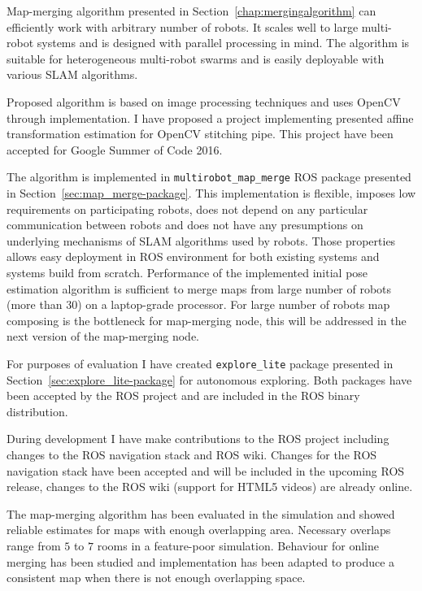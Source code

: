
Map-merging algorithm presented in Section~\ref{chap:mergingalgorithm} can efficiently work with arbitrary number of robots. It scales well to large multi-robot systems and is designed with parallel processing in mind. The algorithm is suitable for heterogeneous multi-robot swarms and is easily deployable with various \gls{SLAM} algorithms.

Proposed algorithm is based on image processing techniques and uses \gls{OpenCV} through implementation. I have proposed a project implementing presented affine transformation estimation for \gls{OpenCV} stitching pipe. This project have been accepted for Google Summer of Code 2016.

The algorithm is implemented in \texttt{multirobot\_map\_merge} \gls{ROS} package presented in Section~\ref{sec:map_merge-package}. This implementation is flexible, imposes low requirements on participating robots, does not depend on any particular communication between robots and does not have any presumptions on underlying mechanisms of \gls{SLAM} algorithms used by robots. Those properties allows easy deployment in \gls{ROS} environment for both existing systems and systems build from scratch. Performance of the implemented initial pose estimation algorithm is sufficient to merge maps from large number of robots (more than $30$) on a laptop-grade processor. For large number of robots map composing is the bottleneck for map-merging node, this will be addressed in the next version of the map-merging node.

For purposes of evaluation I have created \texttt{explore\_lite} package presented in Section~\ref{sec:explore_lite-package} for autonomous exploring. Both packages have been accepted by the \gls{ROS} project and are included in the \gls{ROS} binary distribution.

During development I have make contributions to the \gls{ROS} project including changes to the \gls{ROS} navigation stack and \gls{ROS} wiki. Changes for the \gls{ROS} navigation stack have been accepted and will be included in the upcoming \gls{ROS} release, changes to the \gls{ROS} wiki (support for HTML5 videos) are already online.

The map-merging algorithm has been evaluated in the simulation and showed reliable estimates for maps with enough overlapping area. Necessary overlaps range from $5$ to $7$ rooms in a feature-poor simulation. Behaviour for online merging has been studied and implementation has been adapted to produce a consistent map when there is not enough overlapping space.
